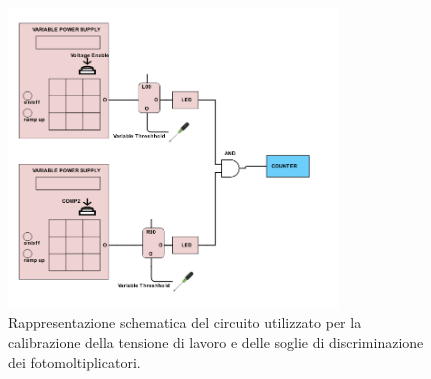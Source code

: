 \documentclass{standalone}
\begin{document}
	\begin{figure}[H]
		\begin{center}
			\includegraphics[width=0.78\textwidth]{./SCHEMI/Tension.png} %
      \caption{\small Rappresentazione schematica del circuito utilizzato per la calibrazione della tensione di lavoro e delle soglie di discriminazione dei fotomoltiplicatori.}
			\label{fig:circ-tens}
		\end{center}
	\end{figure}
\end{document}
